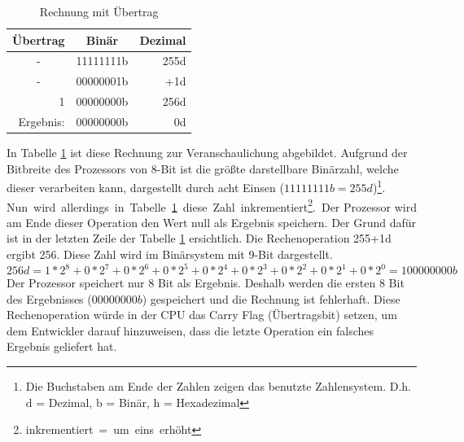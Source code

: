 \documentclass[a4paper,12pt]{article}
\begin{document}
\begin{table}[!htb]
\centering
\begin{tabular}{|c|r|r|}
\hline
\textbf{Übertrag}               & \multicolumn{1}{c|}{\textbf{Binär}} & \multicolumn{1}{c|}{\textbf{Dezimal}} \\ \hline
-                               & 11111111b                            & 255d                                   \\ \hline
-                               & 00000001b                            & +1d                                     \\ \hline
\multicolumn{1}{|r|}{1}         & 00000000b                            & 256d                                   \\ \hline\hline
\multicolumn{1}{|r|}{Ergebnis:} & 00000000b                            & 0d                                     \\ \hline
\end{tabular}
\caption{Rechnung mit Übertrag}
\label{tab:uebertrag}
\end{table}

\noindent In Tabelle \ref{tab:uebertrag} ist diese Rechnung zur Veranschaulichung abgebildet. Aufgrund der Bitbreite des Prozessors von 8-Bit ist die größte darstellbare Binärzahl, welche dieser verarbeiten kann, dargestellt durch acht Einsen ($11111111b = 255d$)\footnote{Die Buchstaben am Ende der Zahlen zeigen das benutzte Zahlensystem. D.h. d = Dezimal, b = Binär, h = Hexadezimal}. \mbox{Nun wird allerdings in Tabelle \ref{tab:uebertrag} diese Zahl inkrementiert\footnote{inkrementiert = um eins erhöht}. }Der Prozessor wird am Ende dieser Operation den Wert null als Ergebnis speichern. Der Grund dafür ist in der letzten Zeile der Tabelle \ref{tab:uebertrag} ersichtlich. Die Rechenoperation 255+1d ergibt 256. Diese Zahl wird im Binärsystem mit 9-Bit dargestellt.
$$256d = 1*2^8+0*2^7+0*2^6+0*2^5+0*2^4+0*2^3+0*2^2+0*2^1+0*2^0 = 100000000b$$
Der Prozessor speichert nur 8 Bit als Ergebnis. Deshalb werden die ersten 8 Bit des Ergebnisses ($00000000b$) gespeichert und die Rechnung ist fehlerhaft. Diese Rechenoperation würde in der CPU das Carry Flag (Übertragsbit) setzen, um dem Entwickler darauf hinzuweisen, dass die letzte Operation ein falsches Ergebnis geliefert hat. 
\end{document}
